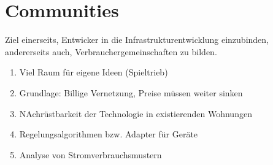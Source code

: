 \section{Communities}\label{sec:communities}
Ziel einerseits, Entwicker in die Infrastrukturentwicklung einzubinden,
andererseits auch, Verbrauchergemeinschaften zu bilden.


\begin{enumerate}
  \item Viel Raum für eigene Ideen (Spieltrieb)
  \item Grundlage: Billige Vernetzung, Preise müssen weiter sinken
  \item NAchrüstbarkeit der Technologie in existierenden Wohnungen
  \item Regelungsalgorithmen bzw. Adapter für Geräte
  \item Analyse von Stromverbrauchsmustern
\end{enumerate}

